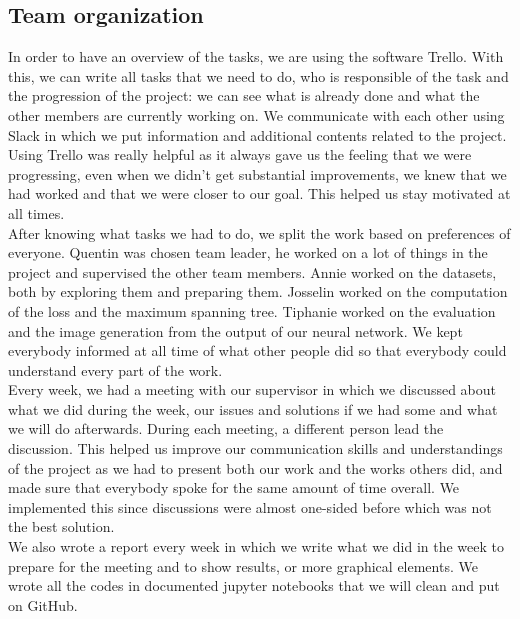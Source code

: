 \subsection{Team organization}

In order to have an overview of the tasks, we are using the software Trello.
With this, we can write all tasks that we need to do, who is responsible of
the task and the progression of the project: we can see what is already done
and what the other members are currently working on. We communicate with each
other using Slack in which we put information and additional contents related
to the project. \\
Using Trello was really helpful as it always gave us the feeling that we were
progressing, even when we didn't get substantial improvements, we knew that we
had worked and that we were closer to our goal. This helped us stay motivated
at all times.\\

After knowing what tasks we had to do, we split the work based on preferences of
everyone. Quentin was chosen team leader, he worked on a lot of things in the
project and supervised the other team members. Annie worked on the datasets,
both by exploring them and preparing them.
Josselin worked on the computation of the loss and the maximum spanning tree.
Tiphanie worked on the evaluation and the image generation from the output of
our neural network.
We kept everybody informed at all time of what other people did so that
everybody could understand every part of the work.\\

Every week, we had a meeting with our supervisor in which we discussed about
what we did during the week, our issues and solutions if we had some and what
we will do afterwards. During each meeting, a different person lead the
discussion. This helped us improve our communication skills and understandings 
of the project as we had to
present both our work and the works others did, and made sure that everybody
spoke for the same amount of time overall. We implemented this since
discussions were almost one-sided before which was not the best solution.\\

We also wrote a report every week in which we write what we did in
the week to prepare for the meeting and to show results, or more graphical
elements. We wrote all the codes in documented jupyter notebooks that we will clean and put on GitHub. \\

